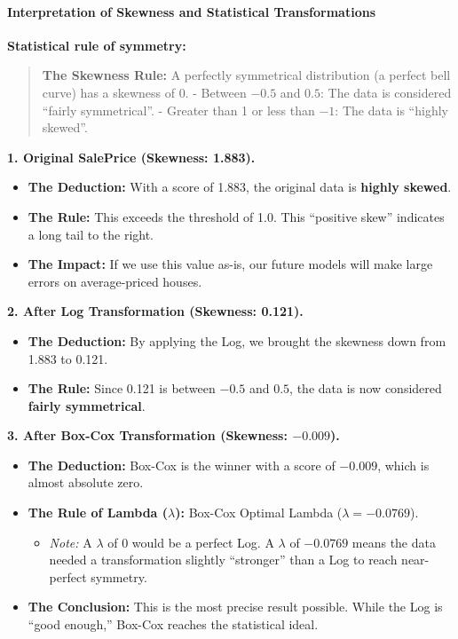 \paragraph{Interpretation of Skewness and Statistical
Transformations}\label{interpretation-of-skewness-and-statistical-transformations}

\textbf{Statistical rule of symmetry:}

\begin{quote}
\textbf{The Skewness Rule:} A perfectly symmetrical distribution (a
perfect bell curve) has a skewness of 0. - Between \(-0.5\) and \(0.5\):
The data is considered ``fairly symmetrical''. - Greater than 1 or less
than \(-1\): The data is ``highly skewed''.
\end{quote}

\textbf{1. Original SalePrice (Skewness: 1.883).}

\begin{itemize}
\tightlist
\item
  \textbf{The Deduction:} With a score of 1.883, the original data is
  \textbf{highly skewed}.
\item
  \textbf{The Rule:} This exceeds the threshold of 1.0. This ``positive
  skew'' indicates a long tail to the right.
\item
  \textbf{The Impact:} If we use this value as-is, our future models
  will make large errors on average-priced houses.
\end{itemize}

\textbf{2. After Log Transformation (Skewness: 0.121).}

\begin{itemize}
\tightlist
\item
  \textbf{The Deduction:} By applying the Log, we brought the skewness
  down from 1.883 to 0.121.
\item
  \textbf{The Rule:} Since 0.121 is between \(-0.5\) and \(0.5\), the
  data is now considered \textbf{fairly symmetrical}.
\end{itemize}

\textbf{3. After Box-Cox Transformation (Skewness: \(-0.009\)).}

\begin{itemize}
\tightlist
\item
  \textbf{The Deduction:} Box-Cox is the winner with a score of
  \(-0.009\), which is almost absolute zero.
\item
  \textbf{The Rule of Lambda (\(\lambda\)):} Box-Cox Optimal Lambda
  (\(\lambda = -0.0769\)).

  \begin{itemize}
  \tightlist
  \item
    \emph{Note:} A \(\lambda\) of 0 would be a perfect Log. A
    \(\lambda\) of \(-0.0769\) means the data needed a transformation
    slightly ``stronger'' than a Log to reach near-perfect symmetry.
  \end{itemize}
\item
  \textbf{The Conclusion:} This is the most precise result possible.
  While the Log is ``good enough,'' Box-Cox reaches the statistical
  ideal.
\end{itemize}

